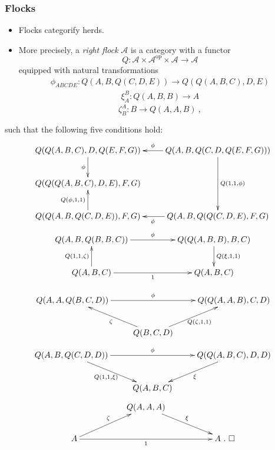 \documentclass{beamer}
\newcommand{\lra}{\longrightarrow}
\def\CA{{\mathscr A}}
\begin{document}
\begin{frame}
  \frametitle{Flocks}

 \begin{itemize}
\item Flocks categorify herds. 
\pause
\item More precisely, a {\em right flock} $\CA$ is a category with a functor 
$$Q : \CA\times \CA^{\mathrm{op}} \times \CA \lra \CA$$ 
equipped with natural transformations
\begin{gather*}
\phi_{ABCDE} :Q( A,B,Q(C,D,E)) \longrightarrow Q(Q(A,B,C),D,E)
\end{gather*}
\begin{gather*}
\xi _{A}^{B}:Q( A,B,B) \longrightarrow A
\end{gather*}
\begin{equation*}
\zeta _{B}^{A}:B\longrightarrow Q( A,A,B) \ ,
\end{equation*}
\end{itemize}
\end{frame}
\begin{frame}
such that the following five conditions hold:
\begin{gather*}
\begin{split}
\xymatrix{
Q(Q(A,B,C),D,Q(E,F,G)) \ar[d]_{\phi}="1" & Q(A,B,Q(C,D,Q(E,F,G))) \ar[l]_{\phi} \ar[dd]^{Q(1,1,\phi)}\\
Q(Q(Q(A,B,C),D,E),F,G)  &  \\
Q(Q(A,B,Q(C,D,E)),F,G)\ar[u]^{Q(\phi,1,1)}  & Q(A,B,Q(Q(C,D,E),F,G) \ar[l]^{\phi}
} 
\end{split}\\ 
\begin{split}
\xymatrix{
Q(A,B,Q(B,B,C)) \ar[rr]^-{\phi} && Q(Q(A,B,B),B,C) \ar[d]^{Q(\xi,1,1)}="2" \\
Q(A,B,C) \ar[u]^{Q(1,1,\zeta)}="1" \ar[rr]_{1} && Q(A,B,C)
} 
\end{split}
\end{gather*}
\end{frame}
\begin{frame}
\begin{equation*}
\xymatrix{
Q(A,A,Q(B,C,D)) \ar[rr]^{\phi}   && Q(Q(A,A,B),C,D)  \\
& Q(B,C,D) \ar[lu]^{\zeta} \ar[ru]_{Q(\zeta,1,1)}  &
}
\end{equation*}
\begin{equation*}
\xymatrix{
Q(A,B,Q(C,D,D)) \ar[rd]_{Q(1,1,\xi)}\ar[rr]^{\phi}   && Q(Q(A,B,C),D,D) \ar[ld]^{\xi} \\
& Q(A,B,C)  &
}
\end{equation*}
\begin{gather*}
\begin{split}
\xymatrix{
&& Q(A,A,A)\ar[rrd]^{\xi} && \\
A \ar[rru]^{\zeta} \ar[rrrr]_-{1} &&  &&  A \ . \ \square 
} 
\end{split}
\end{gather*}
\end{frame}
\end{document}
